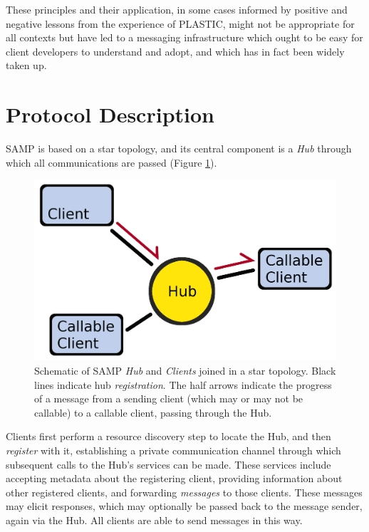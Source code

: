 \documentclass[5p]{elsarticle}
\begin{document}
These principles and their application, in some cases informed
by positive and negative lessons from the experience of PLASTIC,
might not be appropriate for all contexts
but have led to a messaging infrastructure
which ought to be easy for client developers to understand and adopt,
and which has in fact been widely taken up.

\section{Protocol Description} \label{sec:protocol}

SAMP is based on a star topology, and its central component is a
{\em Hub\/} through which all communications are passed
(Figure \ref{fig:topology}).
\begin{figure}
\begin{center}
\includegraphics[width=0.9\columnwidth]{topology-a.png}
\end{center}
\caption{\label{fig:topology}
Schematic of SAMP {\em Hub\/} and {\em Clients\/} joined in a star topology.
Black lines indicate hub {\em registration\/}.
The half arrows indicate the progress of a message
from a sending client (which may or may not be callable)
to a callable client, passing through the Hub.
}
\end{figure}
Clients first perform a resource discovery step to locate the Hub,
and then {\em register\/} with it, establishing a private communication
channel through which subsequent calls to the Hub's services can be made.
These services include accepting metadata about the registering client,
providing information about other registered clients,
and forwarding {\em messages\/} to those clients.
These messages may elicit responses, which may optionally be passed
back to the message sender, again via the Hub.
All clients are able to send messages in this way.
\end{document}
